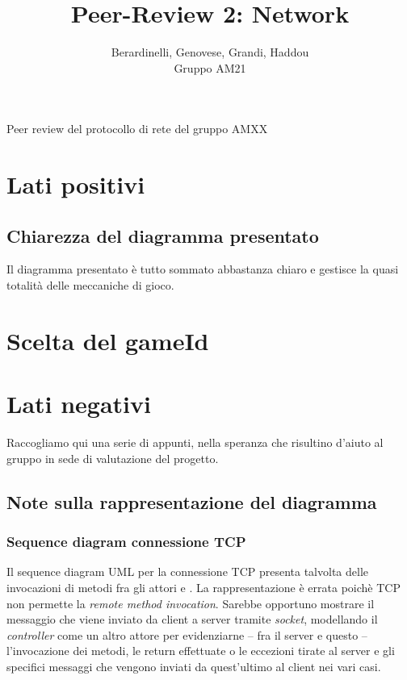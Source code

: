 \documentclass[12pt]{article}
\title{Peer-Review 2: Network}
\author{Berardinelli, Genovese, Grandi, Haddou\\Gruppo AM21}
\newcommand*\ttvar[1]{\texttt{\expandafter\dottvar\detokenize{#1}\relax}}
\newcommand*\dottvar[1]{\ifx\relax#1\else
  \expandafter\ifx\string.#1\string.\allowbreak\else#1\fi
  \expandafter\dottvar\fi}
\begin{document}
\maketitle
\begin{center}
Peer review del protocollo di rete del gruppo AMXX 
\end{center}

\tableofcontents
\newpage

\section{Lati positivi}
\subsection{Chiarezza del diagramma presentato}
Il diagramma presentato è tutto sommato abbastanza chiaro e gestisce la quasi totalità delle meccaniche di gioco. 

\section{Scelta del gameId}

\section{Lati negativi}
Raccogliamo qui una serie di appunti, nella speranza che risultino d'aiuto al gruppo in sede di valutazione del progetto.  

\subsection{Note sulla rappresentazione del diagramma}
 \subsubsection{Sequence diagram connessione TCP}
 Il sequence diagram UML per la connessione TCP presenta talvolta delle invocazioni di metodi fra gli attori \ttvar{Client} e \ttvar{Server}. La rappresentazione è errata poichè TCP non permette la \textit{remote method invocation}. Sarebbe opportuno mostrare il messaggio che viene inviato da client a server tramite \textit{socket}, modellando il \textit{controller} come un altro attore per evidenziarne -- fra il server e questo -- l'invocazione dei metodi, le return effettuate o le eccezioni tirate al server e gli specifici messaggi che vengono inviati da quest'ultimo al client nei vari casi.
\end{document}
